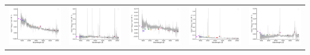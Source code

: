 \begin{center}
\begin{longtable}{l l l l l }
    \includegraphics[width=0.19\linewidth, clip]{Figs/Figs-sdss/spec-0687-52518-0474-STRIPE82-0008-013742.pdf} & \includegraphics[width=0.19\linewidth, clip]{Figs/Figs-sdss/spec-0688-52203-0315-STRIPE82-0007-044146.pdf} & \includegraphics[width=0.19\linewidth, clip]{Figs/Figs-sdss/spec-0689-52262-0087-STRIPE82-0013-019963.pdf} & \includegraphics[width=0.19\linewidth, clip]{Figs/Figs-sdss/spec-0689-52262-0247-STRIPE82-0011-015494.pdf} & \includegraphics[width=0.19\linewidth, clip]{Figs/Figs-sdss/spec-0689-52262-0468-STRIPE82-0012-027933.pdf} \\

\end{longtable}
\end{center}
